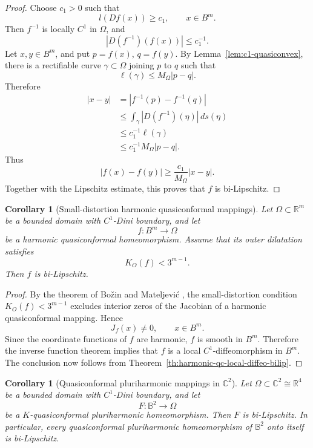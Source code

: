 \documentclass[11pt]{amsart}
\newtheorem{corollary}[theorem]{Corollary}
\theoremstyle{definition}
\theoremstyle{remark}
\newcommand{\C}{\mathbb C}
\newcommand{\R}{\mathbb R}
\begin{document}
\begin{proof}
Choose \(c_1>0\) such that
\[
        l(Df(x))\ge c_1,
        \qquad x\in B^m.
\]
Then \(f^{-1}\) is locally \(C^1\) in \(\Omega\), and
\[
        |D(f^{-1})(f(x))|\le c_1^{-1}.
\]
Let \(x,y\in B^m\), and put \(p=f(x)\), \(q=f(y)\).  By
Lemma~\ref{lem:c1-quasiconvex}, there is a rectifiable curve
\(\gamma\subset\Omega\) joining \(p\) to \(q\) such that
\[
        \ell(\gamma)\le M_\Omega |p-q|.
\]
Therefore
\[
\begin{aligned}
        |x-y|
        &=|f^{-1}(p)-f^{-1}(q)|                         \\
        &\le \int_\gamma |D(f^{-1})(\eta)|\,ds(\eta)       \\
        &\le c_1^{-1}\ell(\gamma)                         \\
        &\le c_1^{-1}M_\Omega |p-q|.
\end{aligned}
\]
Thus
\[
        |f(x)-f(y)|\ge \frac{c_1}{M_\Omega}|x-y|.
\]
Together with the Lipschitz estimate, this proves that \(f\) is
bi-Lipschitz.
\end{proof}


\begin{corollary}[Small-distortion harmonic quasiconformal mappings]
\label{cor:small-distortion-dini-bilip}
Let \(\Omega\subset\R^m\) be a bounded domain with \(C^1\)-Dini
boundary, and let
\[
        f:B^m\to\Omega
\]
be a harmonic quasiconformal homeomorphism. Assume that its outer
dilatation satisfies
\[
        K_O(f)<3^{m-1}.
\]
Then \(f\) is bi-Lipschitz.
\end{corollary}

\begin{proof}
By the theorem of Bo\v zin and Mateljevi\'c
\cite{BozinMateljevic2015}, the small-distortion condition
\(K_O(f)<3^{m-1}\) excludes interior zeros of the Jacobian of a harmonic
quasiconformal mapping. Hence
\[
        J_f(x)\neq 0,
        \qquad x\in B^m .
\]
Since the coordinate functions of \(f\) are harmonic, \(f\) is smooth in
\(B^m\). Therefore the inverse function theorem implies that \(f\) is a
local \(C^1\)-diffeomorphism in \(B^m\). The conclusion now follows
from Theorem~\ref{th:harmonic-qc-local-diffeo-bilip}.
\end{proof}

\begin{corollary}[Quasiconformal pluriharmonic mappings in \(\C^2\)]
\label{cor:pluriharmonic-c2-bilip}
Let \(\Omega\subset\C^2\cong\R^4\) be a bounded domain with \(C^1\)-Dini
boundary, and let
\[
        F:\mathbb B^2\to\Omega
\]
be a \(K\)-quasiconformal pluriharmonic homeomorphism. Then \(F\) is
bi-Lipschitz. In particular, every quasiconformal pluriharmonic
homeomorphism of \(\mathbb B^2\) onto itself is bi-Lipschitz.
\end{corollary}
\end{document}
